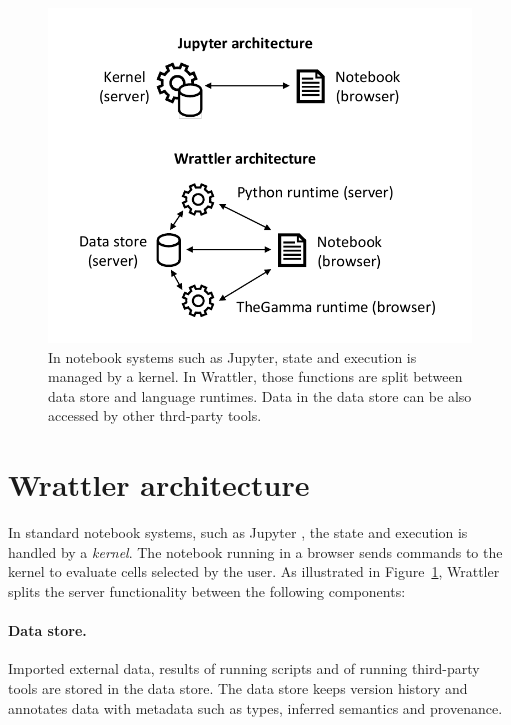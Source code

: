 \documentclass[sigplan]{acmart}\settopmatter{printfolios=true,printccs=false,printacmref=false}
\begin{document}
\begin{figure}[b]
\vspace{-1em}
\includegraphics[scale=0.6]{diagram.pdf}
\vspace{-0.5em}
\caption{\small{In notebook systems such as Jupyter, state and execution is managed by a kernel. In
  Wrattler, those functions are split between data store and language runtimes. Data in the data store
  can be also accessed by other thrd-party tools.}}
\label{fig:arch}
\end{figure}

\section{Wrattler architecture}
\label{sec:arch}

In standard notebook systems, such as Jupyter \cite{jupyter}, the state and execution is handled by a 
\emph{kernel}. The notebook running in a browser sends commands to the kernel to evaluate 
cells selected by the user. As illustrated in Figure~\ref{fig:arch}, Wrattler splits the 
server functionality between the following components:

\paragraph{Data store.} Imported external data, results of running scripts and of 
running third-party tools are stored in the data store. The data store keeps version history
and annotates data with metadata such as types, inferred semantics and provenance.
\end{document}
